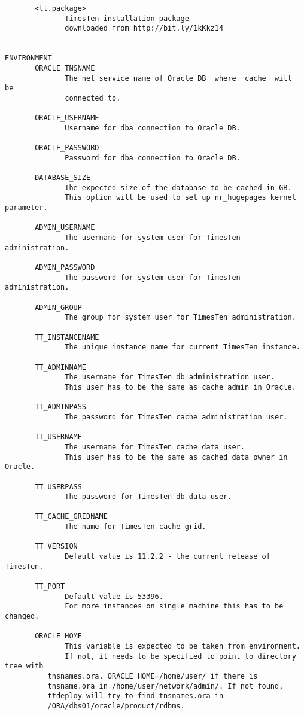 \documentclass[11pt, letterpaper]{article}
\begin{document}
\begin{lstlisting}
       <tt.package>
              TimesTen installation package
              downloaded from http://bit.ly/1kKkz14


ENVIRONMENT
       ORACLE_TNSNAME
              The net service name of Oracle DB  where  cache  will  be
              connected to.

       ORACLE_USERNAME
              Username for dba connection to Oracle DB.

       ORACLE_PASSWORD
              Password for dba connection to Oracle DB.

       DATABASE_SIZE
              The expected size of the database to be cached in GB.
              This option will be used to set up nr_hugepages kernel parameter.

       ADMIN_USERNAME
              The username for system user for TimesTen administration.

       ADMIN_PASSWORD
              The password for system user for TimesTen administration.

       ADMIN_GROUP
              The group for system user for TimesTen administration.

       TT_INSTANCENAME
              The unique instance name for current TimesTen instance.

       TT_ADMINNAME
              The username for TimesTen db administration user.
              This user has to be the same as cache admin in Oracle.

       TT_ADMINPASS
              The password for TimesTen cache administration user.

       TT_USERNAME
              The username for TimesTen cache data user.
              This user has to be the same as cached data owner in Oracle.

       TT_USERPASS
              The password for TimesTen db data user.

       TT_CACHE_GRIDNAME
              The name for TimesTen cache grid.

       TT_VERSION
              Default value is 11.2.2 - the current release of TimesTen.

       TT_PORT
              Default value is 53396.
              For more instances on single machine this has to be changed.          

       ORACLE_HOME
              This variable is expected to be taken from environment.
              If not, it needs to be specified to point to directory tree with
	      tnsnames.ora. ORACLE_HOME=/home/user/ if there is 
	      tnsname.ora in /home/user/network/admin/. If not found, 
	      ttdeploy will try to find tnsnames.ora in 
	      /ORA/dbs01/oracle/product/rdbms.


\end{lstlisting}
\end{document}
